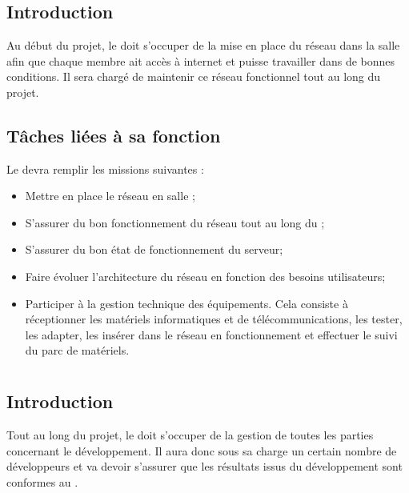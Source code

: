 \newpage
\section{\RRS}
\subsection*{Introduction}

Au début du projet, le \RRS{} doit s'occuper de la mise en place du réseau dans la salle \PICCourt afin que chaque membre ait accès à internet et puisse travailler dans de bonnes conditions. Il sera chargé de maintenir ce réseau fonctionnel tout au long du projet.

\subsection*{Tâches liées à sa fonction}

Le \RRS{} devra remplir les missions suivantes :
\begin{itemize}
	\item Mettre en place le réseau en salle \PICCourt;
	\item S'assurer du bon fonctionnement du réseau tout au long du \PICCourt;
	\item S'assurer du bon état de fonctionnement du serveur;
	\item Faire évoluer l'architecture du réseau en fonction des besoins utilisateurs;
	\item Participer à la gestion technique des équipements. Cela consiste à réceptionner les matériels informatiques et de télécommunications, les tester, les adapter, les insérer dans le réseau en fonctionnement et effectuer le suivi du parc de matériels.
\end{itemize}

\newpage
\section{\RD}
\subsection*{Introduction}

Tout au long du projet, le \RD{} doit s'occuper de la gestion de toutes les parties concernant le développement. Il aura donc sous sa charge un certain nombre de développeurs et va devoir s'assurer que les résultats issus du développement sont conformes au \DGQDEUXCourt.

